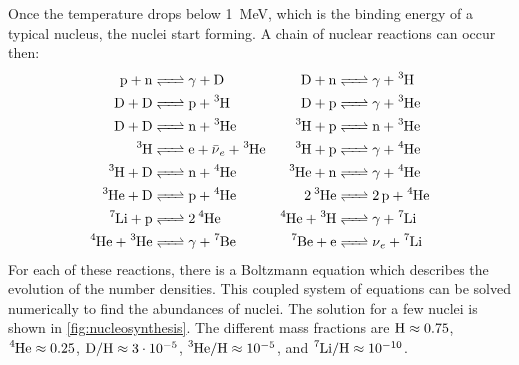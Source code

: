 Once the temperature drops below \SI{1}{\MeV}, which is the binding energy of a typical nucleus, the nuclei start forming. A chain of nuclear reactions can occur then:
\begin{align*}
	\ce{p + n &<=> \gamma{} + D} &
	\ce{D + n &<=> \gamma{} + ^3H} \\
	\ce{D + D &<=> p + ^3H} &
	\ce{D + p &<=> \gamma{} + ^3He} \\
	\ce{D + D &<=> n + ^3He} &
	\ce{^3H + p &<=> n + ^3He} \\
	\ce{^3H &<=> e + \bar{\nu}_e + ^3He} &
	\ce{^3H + p &<=> \gamma{} + ^4He} \\
	\ce{^3H + D &<=> n + ^4He} & 
	\ce{^3He + n &<=> \gamma{} + ^4He} \\
	\ce{^3He + D &<=> p + ^4He} &
	\ce{2 ^3He &<=> 2p + ^4He} \\
	\ce{^7Li + p &<=> 2 ^4He} &
	\ce{^4He + ^3H &<=> \gamma{} + ^7Li} \\
	\ce{^4He + ^3He &<=> \gamma{} + ^7Be} &
	\ce{^7Be + e &<=> \nu_e + ^7Li}
\end{align*}
For each of these reactions, there is a Boltzmann equation which describes the evolution of the number densities. This coupled system of equations can be solved numerically to find the abundances of nuclei. The solution for a few nuclei is shown in \cref{fig:nucleosynthesis}.
The different mass fractions are $\ce{H} \approx 0.75$, $ \ce{^4He} \approx 0.25$, $\ce{D}/\ce{H} \approx \num{3e-5}$, $ \ce{^3He}/\ce{H} \approx \num{e-5}$, and $\ce{^7Li}/\ce{H} \approx \num{e-10}$.


